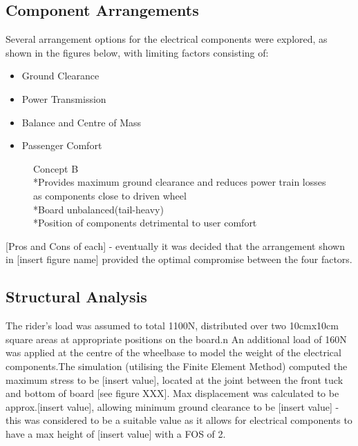 \documentclass[journal,10pt]{IEEEtran}
\begin{document}
    \subsection{Component Arrangements}
        Several arrangement options for the electrical components were explored, as shown in the figures below, with limiting factors consisting of:
        \begin{itemize}
            	\item Ground Clearance
            	\item Power Transmission
            	\item Balance and Centre of Mass
            	\item Passenger Comfort
            \end{itemize}
        \begin{figure}[H]
                \centering
                \caption{Concept B
                \\*Provides maximum ground clearance and reduces power train losses as components close to driven wheel
                \\*Board unbalanced(tail-heavy)
                \\*Position of components detrimental to user comfort}
                \label{fig:ConceptB}
            \end{figure}    
        [Pros and Cons of each] - eventually it was decided that the arrangement shown in [insert figure name] provided the optimal compromise between the four factors.
    \subsection{Structural Analysis}
        The rider's load was assumed to total 1100N, distributed over two 10cmx10cm square areas at appropriate positions on the board.n An additional load of 160N was applied at the centre of the wheelbase to model the weight of the electrical components.The simulation (utilising the Finite Element Method) computed the maximum stress to be [insert value], located at the joint between the front tuck and bottom of board [see figure XXX]. Max displacement was calculated to be approx.[insert value], allowing minimum ground clearance to be [insert value] - this was considered to be a suitable value as it allows for electrical components to have a max height of [insert value] with a FOS of 2.
    
\end{document}

